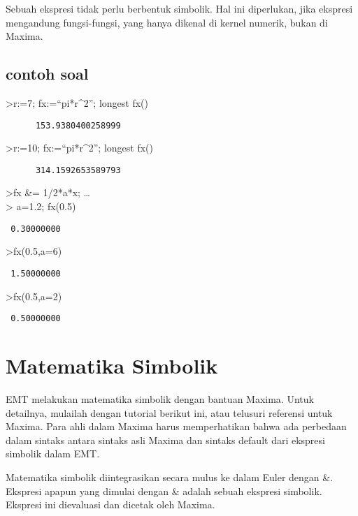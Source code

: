 \documentclass[
]{book}
\begin{document}
Sebuah ekspresi tidak perlu berbentuk simbolik. Hal ini diperlukan, jika ekspresi mengandung fungsi-fungsi, yang hanya dikenal di kernel numerik, bukan di Maxima.

\section{contoh soal}\label{contoh-soal-5}

\textgreater r:=7; fx:=``pi*r\^{}2''; longest fx()

\begin{verbatim}
      153.9380400258999 
\end{verbatim}

\textgreater r:=10; fx:=``pi*r\^{}2''; longest fx()

\begin{verbatim}
      314.1592653589793 
\end{verbatim}

\textgreater fx \&= 1/2*a*x; \ldots{}\\
\textgreater{} a=1.2; fx(0.5)

\begin{verbatim}
 0.30000000 
\end{verbatim}

\textgreater fx(0.5,a=6)

\begin{verbatim}
 1.50000000 
\end{verbatim}

\textgreater fx(0.5,a=2)

\begin{verbatim}
 0.50000000 
\end{verbatim}

\chapter{Matematika Simbolik}\label{matematika-simbolik}

EMT melakukan matematika simbolik dengan bantuan Maxima. Untuk detailnya, mulailah dengan tutorial berikut ini, atau telusuri referensi untuk Maxima. Para ahli dalam Maxima harus memperhatikan bahwa ada perbedaan dalam sintaks antara sintaks asli Maxima dan sintaks default dari ekspresi simbolik dalam EMT.

Matematika simbolik diintegrasikan secara mulus ke dalam Euler dengan \&. Ekspresi apapun yang dimulai dengan \& adalah sebuah ekspresi simbolik. Ekspresi ini dievaluasi dan dicetak oleh Maxima.
\end{document}
